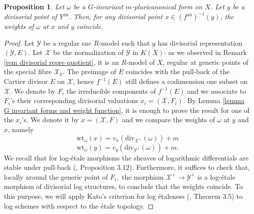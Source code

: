 \documentclass{amsart}%
\numberwithin{equation}{subsection}
\theoremstyle{plain2}
\newtheorem{prop}[equation]{Proposition}
\theoremstyle{definition2}
\theoremstyle{stepstyle}
\theoremstyle{point}
\theoremstyle{subpoint}
\newcommand{\cX}{\ensuremath{\mathscr{X}}}
\newcommand{\cY}{\ensuremath{\mathscr{Y}}}
\renewcommand{\cY}{\ensuremath{\mathscr{Y}}}
\newcommand{\an}{\mathrm{an}}
\newcommand{\divisor}{\mathrm{div}}
\newcommand{\weight}{\mathrm{wt}}
\begin{document}
\begin{prop} \label{prop:G inv form and corresponding weights}
Let $\omega$ be a $G$-invariant $m$-pluricanonical form on $X$. Let $y$ be a divisorial point of $Y^\an$. Then, for any divisorial point $x \in (f^\an)^{-1}(y)$, the weights of $\omega$ at $x$ and $y$ coincide.
\end{prop}
\begin{proof}
Let $\cY$ be a regular snc $R$-model such that $y$ has divisorial representation $(\cY,E)$. Let $\cX$ be the normalization of $\cY$ in $K(X)$: as we observed in Remark \ref{rem divisorial repre quotient}, it is an $R$-model of $X$, regular at generic points of the special fibre $\cX_k$. The preimage of $E$ coincides with the pull-back of the Cartier divisor $E$ on $\cX$, hence $f^{-1}(E)$ still defines a codimension one subset on $\cX$. We denote by $F_i$ the irreducible components of $f^{-1}(E)$ and we associate to $F_i$'s their corresponding divisorial valuations $x_i=(\cX,F_i)$. By Lemma \ref{lemma G invariant forms and weight function}, it is enough to prove the result for one of the $x_i$'s. We denote it by $x = (\cX,F)$ and we compare the weights of $\omega$ at $y$ and $x$, namely
$$\weight_{\omega}(x)=v_{x}(\divisor_{\cX^+}(\omega)) +m $$
$$\weight_{\omega}(y)=v_{y}(\divisor_{\cY^+}(\omega)) +m. $$ We recall that for log-\'{e}tale morphisms the sheaves of logarithmic differentials are stable under pull-back (\cite{Kato1994a}, Proposition 3.12). Furthermore, it suffices to check that, locally around the generic point of $F_i,$ the morphism $\cX^+ \rightarrow \cY^+$ is a log-\'{e}tale morphism of divisorial log structures, to conclude that the weights coincide. To this purpose, we will apply Kato's criterion for log \'{e}taleness (\cite{Kato1989}, Theorem 3.5) to log schemes with respect to the \'{e}tale topology.


\end{proof}
\end{document}
